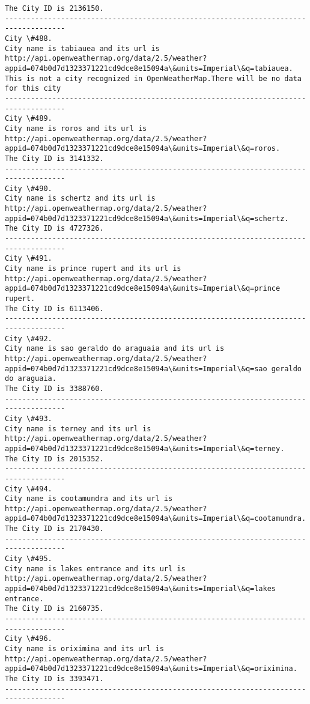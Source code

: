 \documentclass[11pt]{article}
\begin{document}
\begin{Verbatim}[commandchars=\\\{\}]
The City ID is 2136150.
------------------------------------------------------------------------------------
City \#488.
City name is tabiauea and its url is http://api.openweathermap.org/data/2.5/weather?appid=074b0d7d1323371221cd9dce8e15094a\&units=Imperial\&q=tabiauea.
This is not a city recognized in OpenWeatherMap.There will be no data for this city
------------------------------------------------------------------------------------
City \#489.
City name is roros and its url is http://api.openweathermap.org/data/2.5/weather?appid=074b0d7d1323371221cd9dce8e15094a\&units=Imperial\&q=roros.
The City ID is 3141332.
------------------------------------------------------------------------------------
City \#490.
City name is schertz and its url is http://api.openweathermap.org/data/2.5/weather?appid=074b0d7d1323371221cd9dce8e15094a\&units=Imperial\&q=schertz.
The City ID is 4727326.
------------------------------------------------------------------------------------
City \#491.
City name is prince rupert and its url is http://api.openweathermap.org/data/2.5/weather?appid=074b0d7d1323371221cd9dce8e15094a\&units=Imperial\&q=prince rupert.
The City ID is 6113406.
------------------------------------------------------------------------------------
City \#492.
City name is sao geraldo do araguaia and its url is http://api.openweathermap.org/data/2.5/weather?appid=074b0d7d1323371221cd9dce8e15094a\&units=Imperial\&q=sao geraldo do araguaia.
The City ID is 3388760.
------------------------------------------------------------------------------------
City \#493.
City name is terney and its url is http://api.openweathermap.org/data/2.5/weather?appid=074b0d7d1323371221cd9dce8e15094a\&units=Imperial\&q=terney.
The City ID is 2015352.
------------------------------------------------------------------------------------
City \#494.
City name is cootamundra and its url is http://api.openweathermap.org/data/2.5/weather?appid=074b0d7d1323371221cd9dce8e15094a\&units=Imperial\&q=cootamundra.
The City ID is 2170430.
------------------------------------------------------------------------------------
City \#495.
City name is lakes entrance and its url is http://api.openweathermap.org/data/2.5/weather?appid=074b0d7d1323371221cd9dce8e15094a\&units=Imperial\&q=lakes entrance.
The City ID is 2160735.
------------------------------------------------------------------------------------
City \#496.
City name is oriximina and its url is http://api.openweathermap.org/data/2.5/weather?appid=074b0d7d1323371221cd9dce8e15094a\&units=Imperial\&q=oriximina.
The City ID is 3393471.
------------------------------------------------------------------------------------

\end{Verbatim}
\end{document}
